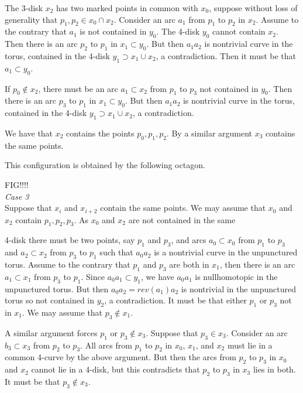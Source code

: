 \documentclass[11pt]{article}
\theoremstyle{remark}
\theoremstyle{definition}
\begin{document}
The 3-disk $x_2$ has two marked points in common with
$x_0$, suppose without loss of generality that $p_1,p_2 \in x_0 \cap x_2$.
Consider an arc $a_1$ from $p_1$ to $p_2$ in $x_2$.
Assume to the contrary that $a_1$ is not contained in $y_0$.
The 4-disk $y_0$ cannot contain $x_2$.
Then there is an arc $p_2$ to $p_1$ in $x_1 \subset y_0$.
But then $a_1a_2$ is nontrivial curve in the torus,
contained in the 4-disk $y_1 \supset x_1 \cup x_2$, a contradiction.
Then it must be that  $a_1 \subset y_0$.

If $p_0 \notin x_2$, there must be an arc $a_1 \subset x_2$
from $p_1$ to $p_3$ not contained in $y_0$.
Then there is an arc $p_3$ to $p_1$ in $x_1 \subset y_0$.
But then $a_1a_2$ is nontrivial curve in the torus,
contained in the 4-disk $y_1 \supset x_1 \cup x_2$, a contradiction.


We have that $x_2$ contains the points $p_0,p_1,p_2$.
By a similar argument $x_3$ contains the same points.

This configuration is obtained by the following octagon.

FIG!!!!\\

\emph{Case 3}\\

Suppose that $x_{i}$ and $x_{i+2}$ contain the same points.
We may assume that $x_0$ and $x_2$ contain $p_1, p_2, p_3$.
As $x_0$ and $x_2$ are not contained in the same


4-disk there must be two points, say $p_1$ and $p_3$,
and arcs $a_0 \subset x_0$ from $p_1$ to $p_3$
and $a_2 \subset x_2$ from $p_3$ to $p_1$
such that $a_0a_2$ is a nontrivial curve in the unpunctured torus.
Assume to the contrary that $p_1$ and $p_3$ are both in $x_1$,
then there is an arc $a_1 \subset x_1$ from $p_3$ to $p_1$.
Since $a_0a_1 \subset y_1$, we have $a_0a_1$ is nullhomotopic
in the unpunctured torus.
But then $a_0a_2 = rev(a_1)a_2$ is nontrivial in the unpunctured torus
so not contained in $y_2$, a contradiction.
It must be that either $p_1$ or $p_3$ not in $x_1$.
We may assume that $p_3 \notin x_1$.

A similar argument forces $p_1$ or $p_3 \notin x_3$.
Suppose that $p_3 \in x_3$.
Consider an arc $b_3 \subset x_3$ from $p_2$ to $p_3$.
All arcs from $p_1$ to $p_2$ in $x_0$, $x_1$, and $x_2$
must lie in a common 4-curve by the above argument.
But then the arcs from $p_2$ to $p_3$
in $x_0$ and $x_2$ cannot lie in a 4-disk,
but this contradicts that $p_2$ to $p_3$ in $x_3$ lies in both.
It must be that $p_3 \notin x_3$.
\end{document}
